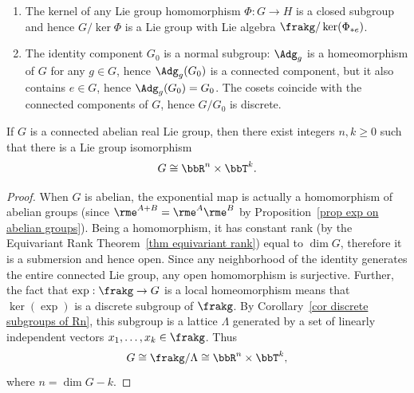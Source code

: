 \begin{example}\label{example kernel subgroup}
    \begin{enumerate}
        \item The kernel of any Lie group homomorphism $\Phi:G\to H$ is a closed subgroup and hence $G\slash \ker\Phi$ is a Lie group with Lie algebra $\frakg\slash\ker(\Phi_{\ast e})$.
        \item The identity component $G_0$ is a normal subgroup: $\Adg_g$ is a homeomorphism of $G$ for any $g\in G$, hence $\Adg_g(G_0)$ is a connected component, but it also contains $e\in G$, hence $\Adg_g(G_0)=G_0$. The cosets coincide with the connected components of $G$, hence $G\slash G_0$ is discrete.
    \end{enumerate}
\end{example}



\begin{cor}
    If $G$ is a connected abelian real Lie group, then there exist integers $n,k\geq 0$ such that there is a Lie group isomorphism
    \[G\cong \bbR^n\times \bbT^k.\]
\end{cor}
\begin{proof}
    When $G$ is abelian, the exponential map is actually a homomorphism of abelian groups (since $\rme^{A+B}=\rme^A\rme^B$ by Proposition~\ref{prop exp on abelian groups}). Being a homomorphism, it has constant rank (by the Equivariant Rank Theorem~\ref{thm equivariant rank}) equal to $\dim G$, therefore it is a submersion and hence open. Since any neighborhood of the identity generates the entire connected Lie group, any open homomorphism is surjective. Further, the fact that $\exp:\frakg\to G$ is a local homeomorphism means that $\ker(\exp)$ is a discrete subgroup of $\frakg$. By Corollary~\ref{cor discrete subgroups of Rn}, this subgroup is a lattice $\Lambda$ generated by a set of linearly independent vectors $x_1,\ldots,x_k\in\frakg$. Thus
    \[G\cong \frakg\slash \Lambda\cong \bbR^n\times \bbT^k,\]
    where $n=\dim G-k$.
\end{proof}



